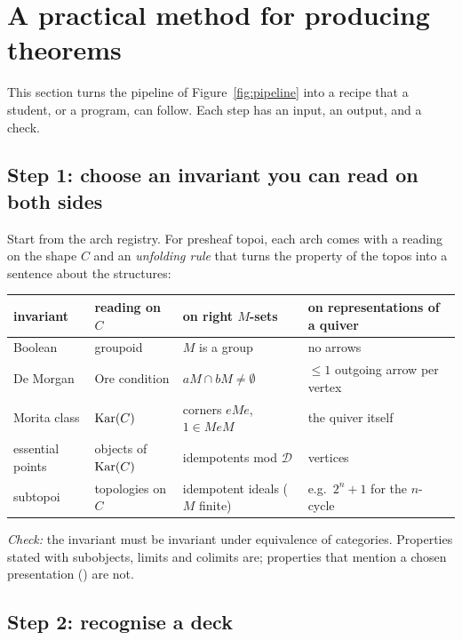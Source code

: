 \section{A practical method for producing theorems}\label{sec:method}

This section turns the pipeline of Figure~\ref{fig:pipeline} into a recipe that a student, or a program, can follow. Each step has an input, an output, and a check.

\subsection{Step 1: choose an invariant you can read on both sides}

Start from the arch registry. For presheaf topoi, each arch comes with a reading on the shape $C$ and an \emph{unfolding rule} that turns the property of the topos into a sentence about the structures:

\begin{center}\small
\begin{tabularx}{\linewidth}{>{\raggedright\arraybackslash}p{2.6cm}>{\raggedright\arraybackslash}p{3.2cm}>{\raggedright\arraybackslash}X>{\raggedright\arraybackslash}X}
\toprule
invariant & reading on $C$ & on right $M$-sets & on representations of a quiver\\
\midrule
Boolean & groupoid & $M$ is a group & no arrows\\
De Morgan & Ore condition & $aM\cap bM\neq\emptyset$ & $\le 1$ outgoing arrow per vertex\\
Morita class & $\operatorname{Kar}(C)$ & corners $eMe$, $1\in MeM$ & the quiver itself\\
essential points & objects of $\operatorname{Kar}(C)$ & idempotents mod $\mathcal D$ & vertices\\
subtopoi & topologies on $C$ & idempotent ideals ($M$ finite) & e.g.\ $2^n+1$ for the $n$-cycle\\
\bottomrule
\end{tabularx}
\end{center}

\emph{Check:} the invariant must be invariant under equivalence of categories. Properties stated with subobjects, limits and colimits are; properties that mention a chosen presentation () are not.

\subsection{Step 2: recognise a deck}

